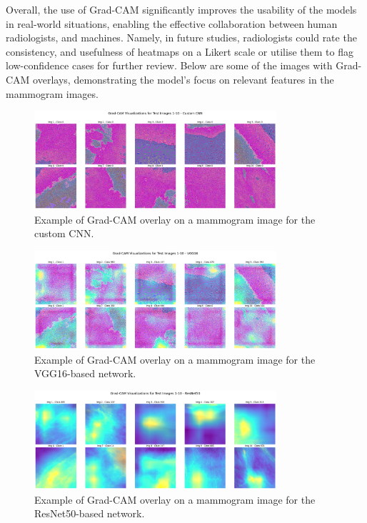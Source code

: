 \documentclass[../main]{subfiles}
\begin{document}
Overall, the use of Grad-CAM significantly improves the usability of the models in real-world situations, enabling the effective collaboration between human radiologists, and machines. Namely, in future studies, radiologists could rate the consistency, and usefulness of heatmaps on a Likert scale or utilise them to flag low-confidence cases for further review. Below are some of the images with Grad-CAM overlays, demonstrating the model's focus on relevant features in the mammogram images.

\begin{figure}[h!]
    \centering
    \includegraphics[width=0.8\textwidth]{assets/grad_cam_custom_cnn.png}
    \caption{Example of Grad-CAM overlay on a mammogram image for the custom CNN.}
    \label{fig:grad-cam-custom-cnn}
\end{figure}

\begin{figure}[h!]
    \centering
    \includegraphics[width=0.8\textwidth]{assets/grad_cam_vgg16.png}
    \caption{Example of Grad-CAM overlay on a mammogram image for the VGG16-based network.}
    \label{fig:grad-cam-vgg16}
\end{figure}

\begin{figure}[h!]
    \centering
    \includegraphics[width=0.8\textwidth]{assets/grad_cam_resnet50.png}
    \caption{Example of Grad-CAM overlay on a mammogram image for the ResNet50-based network.}
    \label{fig:grad-cam-resnet50}
\end{figure}
\end{document}
